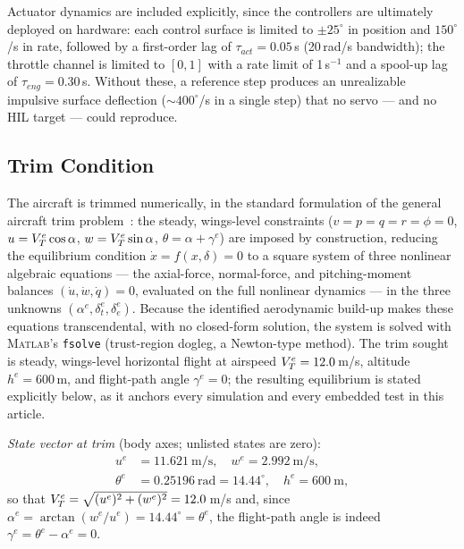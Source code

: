 Actuator dynamics are included explicitly, since the controllers are
ultimately deployed on hardware: each control surface is limited to
$\pm25^\circ$ in position and $150^\circ$/s in rate, followed by a
first-order lag of $\tau_{act}=0.05$\,s (20\,rad/s bandwidth); the
throttle channel is limited to $[0,1]$ with a rate limit of 1\,s$^{-1}$
and a spool-up lag of $\tau_{eng}=0.30$\,s. Without these, a reference
step produces an unrealizable impulsive surface deflection
(${\sim}400^\circ$/s in a single step) that no servo --- and no HIL
target --- could reproduce.

\subsection{Trim Condition}
\label{sec:trim}
The aircraft is trimmed numerically, in the standard formulation of
the general aircraft trim
problem~\cite{marco2007trim,stevens2016aircraft}: the steady,
wings-level constraints ($v=p=q=r=\phi=0$, $u=V_T^e\cos\alpha$,
$w=V_T^e\sin\alpha$, $\theta=\alpha+\gamma^e$) are imposed by
construction, reducing the equilibrium condition
$\dot{x}=f(x,\delta)=0$ to a square system of three nonlinear
algebraic equations --- the axial-force, normal-force, and
pitching-moment balances $(\dot{u},\dot{w},\dot{q})=0$, evaluated on
the full nonlinear dynamics --- in the three unknowns
$(\alpha^e,\delta_t^e,\delta_e^e)$. Because the identified
aerodynamic build-up makes these equations transcendental, with no
closed-form solution, the system is solved with \textsc{Matlab}'s
\texttt{fsolve} (trust-region dogleg, a Newton-type method). The trim
sought is steady, wings-level horizontal flight at airspeed
$V_T^e = 12.0$\,m/s, altitude $h^e = 600$\,m, and flight-path angle
$\gamma^e = 0$; the resulting equilibrium is stated explicitly below,
as it anchors every simulation and every embedded test in this
article.

\emph{State vector at trim} (body axes; unlisted states are zero):
\begin{equation}
\label{eq:xtrim}
\begin{aligned}
u^e &= 11.621~\text{m/s}, \quad
w^e = 2.992~\text{m/s}, \\
\theta^e &= 0.25196~\text{rad} = 14.44^\circ, \quad
h^e = 600~\text{m},
\end{aligned}
\end{equation}
so that $V_T^e=\sqrt{(u^e)^2+(w^e)^2}=12.0$\,m/s and, since
$\alpha^e=\arctan(w^e/u^e)=14.44^\circ=\theta^e$, the flight-path angle is
indeed $\gamma^e=\theta^e-\alpha^e=0$.

